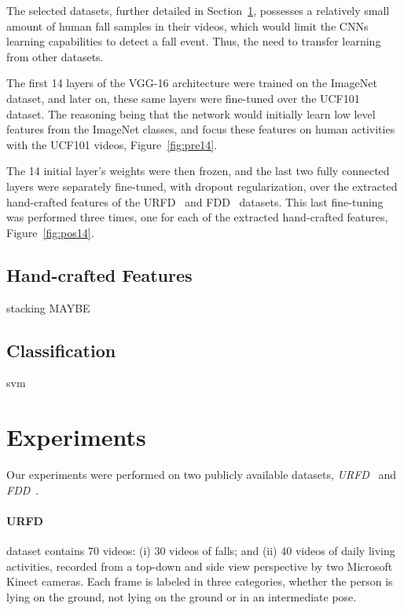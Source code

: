 \documentclass[conference]{IEEEtran}
\begin{document}
The selected datasets, further detailed in Section~\ref{sec:experiments}, possesses a relatively small amount of human fall samples in their videos, which would limit the CNNs learning capabilities to detect a fall event. Thus, the need to transfer learning from other datasets.

The first 14 layers of the VGG-16 architecture were trained on the ImageNet~\cite{imagenet_cvpr09} dataset, and later on, these same layers were fine-tuned over the UCF101~\cite{soomro2012ucf101} dataset. The reasoning being that the network would initially learn low level features from the ImageNet classes, and focus these features on human activities with the UCF101 videos, Figure~\ref{fig:pre14}.

The 14 initial layer's weights were then frozen, and the last two fully connected layers were separately fine-tuned, with dropout regularization, over the extracted hand-crafted features of the URFD~\cite{kepski2014human} and FDD~\cite{charfi2013optimised} datasets. This last fine-tuning was performed three times, one for each of the extracted hand-crafted features, Figure~\ref{fig:pos14}.

\subsection{Hand-crafted Features}

stacking MAYBE

\subsection{Classification}

svm

\section{Experiments}
\label{sec:experiments}

Our experiments were performed on two publicly available datasets, \textit{URFD}~\cite{kepski2014human} and \textit{FDD}~\cite{charfi2013optimised}.

\paragraph{URFD} dataset contains 70 videos: (i) 30 videos of falls; and (ii) 40 videos of daily living activities, recorded from a top-down and side view perspective by two Microsoft Kinect cameras. Each frame is labeled in three categories, whether the person is lying on the ground, not lying on the ground or in an intermediate pose.
\end{document}
